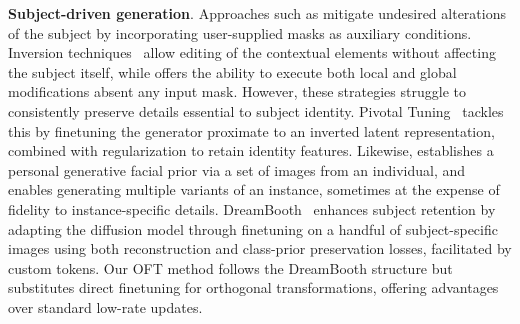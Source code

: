 \textbf{Subject-driven generation}. Approaches such as \cite{avrahami2022blended,nichol2022glide} mitigate undesired alterations of the subject by incorporating user-supplied masks as auxiliary conditions. Inversion techniques~\cite{choi2021ilvr,dhariwal2021diffusion,ramesh2022hierarchical,gal2022image} allow editing of the contextual elements without affecting the subject itself, while \cite{hertz2022prompt} offers the ability to execute both local and global modifications absent any input mask. However, these strategies struggle to consistently preserve details essential to subject identity. Pivotal Tuning~\cite{roich2022pivotal} tackles this by finetuning the generator proximate to an inverted latent representation, combined with regularization to retain identity features. Likewise, \cite{nitzan2022mystyle} establishes a personal generative facial prior via a set of images from an individual, and \cite{casanova2021instance} enables generating multiple variants of an instance, sometimes at the expense of fidelity to instance-specific details. DreamBooth~\cite{ruiz2023dreambooth} enhances subject retention by adapting the diffusion model through finetuning on a handful of subject-specific images using both reconstruction and class-prior preservation losses, facilitated by custom tokens. Our OFT method follows the DreamBooth structure but substitutes direct finetuning for orthogonal transformations, offering advantages over standard low-rate updates.

